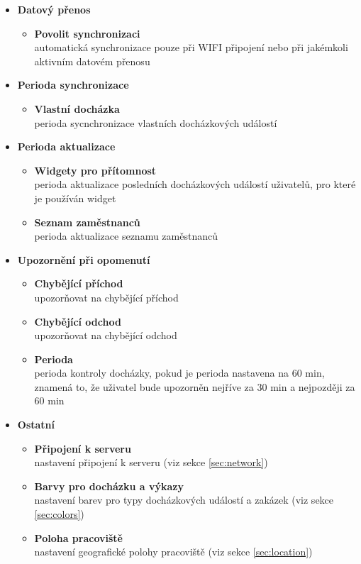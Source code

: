 \documentclass{diplomka}
\begin{document}
\begin{itemize}
\item \textbf{Datový přenos}
\begin{itemize}[noitemsep,nolistsep]
\item  \textbf{Povolit synchronizaci}\\ automatická synchronizace pouze při WIFI připojení nebo při jakémkoli aktivním datovém přenosu 
\end{itemize}
\item \textbf{Perioda synchronizace}
\begin{itemize}[noitemsep,nolistsep]
\item  \textbf{Vlastní docházka}\\ perioda sycnchronizace vlastních docházkových událostí
\end{itemize}
\item \textbf{Perioda aktualizace}
\begin{itemize}[noitemsep,nolistsep]
\item  \textbf{Widgety pro přítomnost} \\ perioda aktualizace posledních docházkových událostí uživatelů, pro které je používán widget 
\item  \textbf{Seznam zaměstnanců}\\ perioda aktualizace seznamu zaměstnanců
\end{itemize}
\item \textbf{Upozornění při opomenutí}
\begin{itemize}[noitemsep,nolistsep]
\item  \textbf{Chybějící příchod} \\upozorňovat na chybějící příchod
\item  \textbf{Chybějící odchod} \\upozorňovat na chybějící odchod
\item  \textbf{Perioda} \\perioda kontroly docházky, pokud je perioda nastavena na 60 min, znamená to, že uživatel bude upozorněn nejříve za 30 min a nejpozději za 60 min
\end{itemize}
\item \textbf{Ostatní}
\begin{itemize}[noitemsep,nolistsep]
\item  \textbf{Připojení k serveru} \\nastavení připojení k serveru (viz sekce \ref{sec:network})
\item  \textbf{Barvy pro docházku a výkazy} \\nastavení barev pro typy docházkových událostí a zakázek (viz sekce \ref{sec:colors})
\item  \textbf{Poloha pracoviště} \\nastavení geografické polohy pracoviště (viz sekce \ref{sec:location})
\end{itemize}
\end{itemize}
\end{document}
